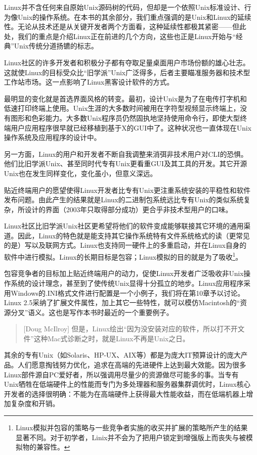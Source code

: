 \documentclass[12pt,oneside]{book}
\begin{document}
Linux并不含任何来自原始Unix源码树的代码，但却是一个依照Unix标准设计、行为像Unix的操作系统。在本书的其余部分，我们重点强调的是Unix和Linux的延续性。无论从技术还是从关键开发者两个方面看，这种延续性都极其紧密——但此处，我们的重点是介绍Linux正在前进的几个方向，这些也正是Linux开始与“经典”Unix传统分道扬镳的标志。

Linux社区的许多开发者和积极分子都有夺取足量桌面用户市场份额的雄心壮志。这就使Linux的目标受众比“旧学派”Unix广泛得多，后者主要瞄准服务器和技术型工作站市场。这一点影响了Linux黑客设计软件的方式。

最明显的变化就是首选界面风格的转变。最初，设计Unix是为了在电传打字机和低速打印终端上使用。Unix生涯的大多数时间被用在字符型视频显示终端上，没有图形和色彩能力。大多数Unix程序员仍然固执地坚持使用命令行，即使大型终端用户应用程序很早就已经移植到基于X的GUI中了。这种状况也一直体现在Unix操作系统及应用程序的设计中。

另一方面，Linux的用户和开发者不断自我调整来消弭非技术用户对CLI的恐惧。他们比旧学派Unix、甚至同时代专有Unix更看重GUI及其工具的开发。其它开源Unix也在发生同样变化，变化虽小，但意义深远。

贴近终端用户的愿望使得Linux开发者比专有Unix更注重系统安装的平稳性和软件发布问题。由此产生的结果就是Linux的二进制包系统远比专有Unix的类似系统复杂，所设计的界面（2003年只取得部分成功）更合乎非技术型用户的口味。

Linux社区比旧学派Unix社区更希望将他们的软件变成能够联接其它环境的通用渠道。因此，Linux的特色就是能支持其它操作系统特有文件系统格式的读（更常见的是）写以及联网方式。Linux也支持同一硬件上的多重启动，并在Linux自身的软件中进行模拟。Linux的长期目标是包容；Linux模拟的目的就是为了吸收\footnote{ Linux模拟并包容的策略与一些竞争者实施的收买并扩展的策略所产生的结果显著不同。对于初学者，Linix并不会为了把用户锁定到增强版上而丧失与被模拟物的兼容性。}。

包容竞争者的目标加上贴近终端用户的动力，促使Linux开发者广泛吸收非Unix操作系统的设计理念，甚至到了使传统Unix显得十分孤立的地步。Linux应用程序采用Windows的.INI格式文件进行配置是一个小例子，我们将在第10章予以讨论。Linux 2.5采纳了扩展文件属性，加上其它一些特性，就可以模仿Macintosh的“资源分叉”语义。这也是写作本书时最近的一个重要例子。

\begin{quote}[Doug McIlroy]
但是，Linux绘出“因为没安装对应的软件，所以打不开文件”这种Mac式诊断之时，就是Linux不再是Unix之日。
\end{quote}

其余的专有Unix（如Solaris、HP-UX、AIX等）都是为庞大IT预算设计的庞大产品。人们愿意掏钱努力优化，追求在高端的先进硬件上达到最大效能。因为很多Linux部件源自PC爱好者，所以强调用尽量少的资源做尽可能多的事。当专有Unix牺牲在低端硬件上的性能而专门为多处理器和服务器集群调优时，Linux核心开发者的选择很明确：不能为在高端硬件上获得最大性能收益，而在低端机器上增加复杂度和开销。
\end{document}
